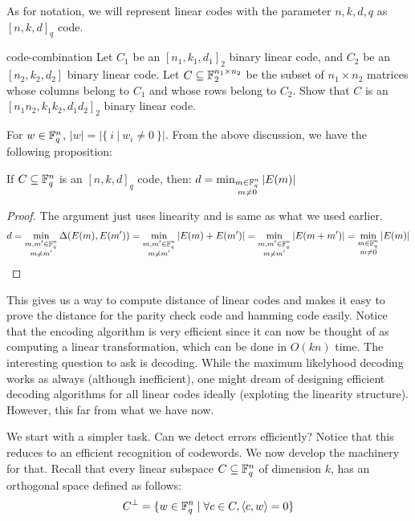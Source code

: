 As for notation, we will represent linear codes with the parameter $n,k,d,q$ as $[n,k,d]_q$ code. 
\begin{exercise-prob}
\begin{show-ps5}{code-combination}
Let $C_1$ be an $[n_1,k_1,d_1]_2$ binary linear code, and $C_2$ be an $[n_2,k_2,d_2]$ binary linear code. Let $C \subseteq {\mathbb{F}}_2^{n_1 \times n_2}$ be the subset of $n_1 \times n_2$ matrices whose columns belong to $C_1$ and whose rows belong to $C_2$. Show that
$C$ is an $[n_1n_2,k_1k_2,d_1d_2]_2$ binary linear code.
\end{show-ps5}
\end{exercise-prob}


For $w \in {\mathbb{F}}_q^n$, $|w| = |\{~i~ | ~w_i \ne 0~\}|$.
From the above discussion, we have the following proposition:
\begin{proposition}
If $C \subseteq {\mathbb{F}}_q^n$ is an $[n,k,d]_q$ code, then:
$d = \min_{\substack{m \in {\mathbb{F}}_q^n \\ m \ne 0}}|E(m)|$
\end{proposition}
\begin{proof}
The argument just uses linearity and is same as what we used earlier.
\[
d = \min_{\substack{m,m' \in {\mathbb{F}}_q^n \\ m \ne m'}}\Delta(E(m),E(m')) = \min_{\substack{m,m' \in {\mathbb{F}}_q^n \\ m \ne m'}}|E(m)+E(m')|= \min_{\substack{m,m' \in {\mathbb{F}}_q^n \\ m \ne m'}}|E(m+m')| = \min_{\substack{m \in {\mathbb{F}}_q^n \\ m \ne 0}}|E(m)| \\
\]
\end{proof}
This gives us a way to compute distance of linear codes and makes it easy to prove the distance for the parity check code and hamming code easily. Notice that the encoding algorithm is very efficient since it can now be thought of as computing a linear transformation, which can be done in $O(kn)$ time. The interesting question to ask is decoding. While the maximum likelyhood decoding works as always (although inefficient), one might dream of designing efficient decoding algorithms for all linear codes ideally (exploting the linearity structure). However, this far from what we have now.

We start with a simpler task. Can we detect errors efficiently? Notice that this reduces to an efficient recognition of codewords. We now develop the machinery for that. Recall that every linear subspace $C \subseteq {\mathbb{F}}_q^n$ of dimension $k$, has an orthogonal space defined as follows:
$$C^{\perp} = \{ w \in {\mathbb{F}}_q^n \mid \forall c \in C, \langle c,w \rangle = 0 \}$$

